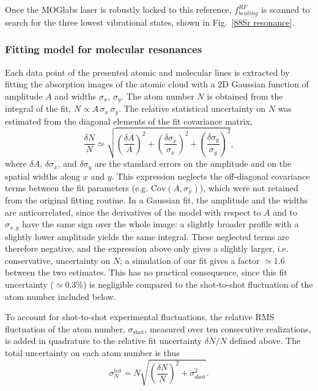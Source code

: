 Once the MOGlabs laser is robustly locked to this reference, $f^{RF}_{beating}$ is
scanned to search for the three lowest vibrational states, shown in
Fig.~\ref{88Sr resonance}.

\subsubsection{Fitting model for molecular resonances}

Each data point of the presented atomic and molecular lines is extracted by fitting the
absorption images of the atomic cloud with a 2D Gaussian function of amplitude $A$ and widths $\sigma_x$, $\sigma_y$.
The atom number $N$
is obtained from the integral of the fit, $N \propto A\,\sigma_x\,\sigma_y$. The relative
statistical uncertainty on $N$ was estimated from the diagonal elements of the fit
covariance matrix,
\begin{equation}
\frac{\delta N}{N} \simeq \sqrt{\left(\frac{\delta A}{A}\right)^2 + \left(\frac{\delta \sigma_x}{\sigma_x}\right)^2 + \left(\frac{\delta \sigma_y}{\sigma_y}\right)^2},
\end{equation}
where $\delta A$, $\delta \sigma_x$, and $\delta \sigma_y$ are the standard errors on the
amplitude and on the spatial widths along $x$ and $y$. This expression neglects the
off-diagonal covariance terms between the fit parameters (e.g.
$\text{Cov}(A,\sigma_x)$), which were not retained from the original fitting routine. In a
Gaussian fit, the amplitude and the widths are anticorrelated, since the derivatives of
the model with respect to $A$ and to $\sigma_{x,y}$ have the same sign over the whole image:
a slightly broader profile with a slightly lower amplitude yields the same integral. These
neglected terms are therefore negative, and the expression above only gives a slightly
larger, i.e. conservative, uncertainty on $N$; a simulation of our fit gives a factor
$\simeq1.6$ between the two estimates. This has no practical consequence, since this fit
uncertainty ($\simeq0.3\%$) is negligible compared to the shot-to-shot fluctuation of the
atom number included below.

To account for shot-to-shot experimental fluctuations, the relative RMS fluctuation of the
atom number, $\sigma_{\text{shot}}$, measured over ten consecutive realizations, is added in
quadrature to the relative fit uncertainty $\delta N/N$ defined above. The total uncertainty
on each atom number is thus
\begin{equation}
\sigma_N^{\text{tot}} = N \sqrt{\left(\frac{\delta N}{N}\right)^2 + \sigma_{\text{shot}}^2}.
\end{equation}

